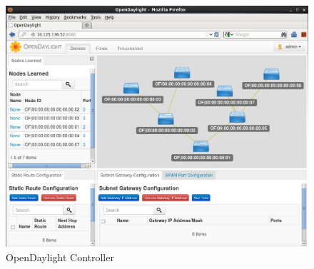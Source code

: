 \documentclass[a4paper, 12pt]{book}
\begin{document}
\begin{enumerate}
\begin{center}
 \begin{figure}
 \begin{center}
   \includegraphics[width=15cm]{img/odl-controller-00.png}
   \caption{OpenDaylight Controller}
   \label{fig:odl_tech_diagram}
 \end{center}
 \end{figure}
\end{center}


\end{enumerate}
\end{document}
